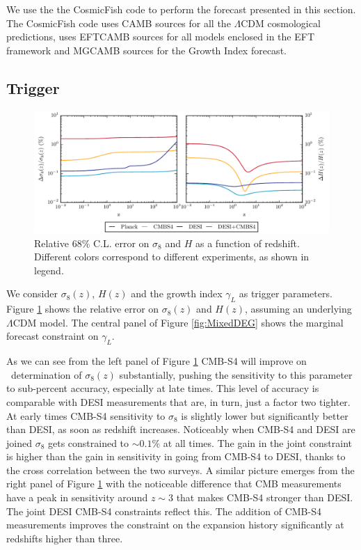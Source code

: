 We use the the CosmicFish code \cite{Raveri:2016xof,Raveri:2016leq} to perform the forecast presented in this section. The CosmicFish code uses CAMB sources \cite{Lewis:1999bs,Challinor:2011bk} for all the $\Lambda$CDM cosmological predictions, uses EFTCAMB sources \cite{Hu:2013twa,Raveri:2014cka} for all models enclosed in the EFT framework and MGCAMB sources \cite{Zhao:2008bn,Hojjati:2011ix} for the Growth Index forecast.

\subsection{Trigger}

\begin{figure}[!tb]
\begin{center}
\includegraphics[width=1.0\textwidth]{DarkEnergy/1_Thomographic}
\caption{Relative $68\%$ C.L. error on $\sigma_{8}$ and $H$ as a function of redshift. Different colors correspond to different experiments, as shown in legend.}\label{fig:GrowthExpansion}
\end{center}
\end{figure}

We consider $\sigma_8(z)$, $H(z)$ and the growth index $\gamma_{L}$ as trigger parameters. Figure \ref{fig:GrowthExpansion} shows the relative error on $\sigma_8(z)$ and $H(z)$, assuming an underlying $\Lambda$CDM model. The central panel of Figure \ref{fig:MixedDEG} shows the marginal forecast constraint on $\gamma_{L}$. 

As we can see from the left panel of Figure \ref{fig:GrowthExpansion} CMB-S4 will improve on \planck\ determination of $\sigma_{8}(z)$ substantially, pushing the sensitivity to this parameter to sub-percent accuracy, especially at late times. 
This level of accuracy is comparable with DESI measurements that are, in turn, just a factor two tighter.
At early times CMB-S4 sensitivity to $\sigma_{8}$ is slightly lower but significantly better than DESI, as soon as redshift increases.
Noticeably when CMB-S4 and DESI are joined $\sigma_{8}$ gets constrained to $\sim 0.1\%$ at all times. The gain in the joint constraint is higher than the gain in sensitivity in going from CMB-S4 to DESI, thanks to the cross correlation between the two surveys.
%
A similar picture emerges from the right panel of Figure \ref{fig:GrowthExpansion} with the noticeable difference that CMB measurements have a peak in sensitivity around $z\sim 3$ that makes CMB-S4 stronger than DESI. The joint DESI CMB-S4 constraints reflect this. The addition of CMB-S4 measurements improves the constraint on the expansion history significantly at redshifts higher than three.

